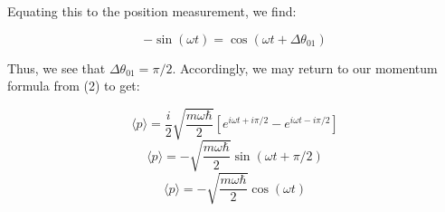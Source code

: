 \begin{enumerate}
    Equating this to the position measurement, we find:

    $$-\sin(\omega t)=\cos(\omega t+\Delta\theta_{01})$$

    Thus, we see that $\Delta\theta_{01}=\pi/2$. Accordingly, we may return to our momentum formula from (2) to get:

    $$\langle p\rangle=\frac{i}{2}\sqrt{\frac{m\omega\hbar}{2}}\left[ e^{i\omega t+i\pi/2}-e^{i\omega t-i\pi/2} \right]$$
    $$\langle p\rangle=-\sqrt{\frac{m\omega\hbar}{2}}\sin(\omega t +\pi/2)$$
    $$\boxed{\langle p\rangle=-\sqrt{\frac{m\omega\hbar}{2}}\cos(\omega t)}$$

\end{enumerate}



